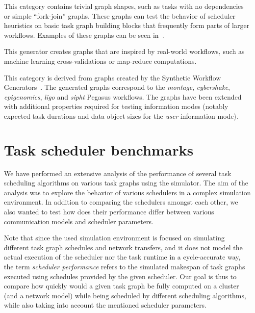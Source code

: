 \begin{description}[wide=0pt]
	\item[elementary] This category contains trivial graph
	shapes, such as tasks with no dependencies or simple ``fork-join'' graphs. These graphs can test the
	behavior of scheduler heuristics on basic task graph building blocks that frequently form parts of
	larger workflows. Examples of these graphs can be seen in~.

	\item[irw] This generator creates graphs that are
	inspired by real-world workflows, such as machine learning cross-validations or map-reduce
	computations.

	\item[pegasus] This category is derived from graphs
	created by the Synthetic Workflow Generators~\cite{pegasusgraphs}. The generated graphs
	correspond to the \emph{montage}, \emph{cybershake}, \emph{epigenomics},
	\emph{ligo} and \emph{sipht} Pegasus workflows. The graphs have been
	extended with additional properties required for testing information modes (notably expected task
	durations and data object sizes for the \emph{user} information mode).
\end{description}

\section{Task scheduler benchmarks}
\label{sec:estee-benchmarks}
We have performed an extensive analysis of the performance of several task scheduling algorithms on
various task graphs using the \estee{} simulator. The aim of the analysis was to
explore the behavior of various schedulers in a complex simulation environment. In addition to
comparing the schedulers amongst each other, we also wanted to test how does their performance
differ between various communication models and scheduler parameters.

Note that since the used simulation environment is focused on simulating different task graph
schedules and network transfers, and it does not model the actual execution of the scheduler nor
the task runtime in a cycle-accurate way, the term \emph{scheduler performance} refers to the simulated
makespan of task graphs executed using schedules provided by the given scheduler. Our goal is thus
to compare how quickly would a given task graph be fully computed on a cluster (and a network
model) while being scheduled by different scheduling algorithms, while also taking into account the
mentioned scheduler parameters.

